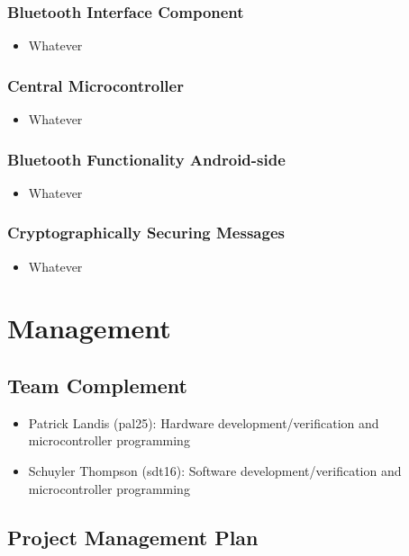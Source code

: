 \documentclass[12pt,letterpaper]{article}
\begin{document}
\subsubsection{Bluetooth Interface Component}
\begin{itemize}
\item Whatever
\end{itemize}

\subsubsection{Central Microcontroller}
\begin{itemize}
\item Whatever
\end{itemize}

\subsubsection{Bluetooth Functionality Android-side}
\begin{itemize}
\item Whatever
\end{itemize}

\subsubsection{Cryptographically Securing Messages}
\begin{itemize}
\item Whatever
\end{itemize}

\section{Management}
\subsection{Team Complement}
\begin{itemize}
	\item Patrick Landis (pal25): Hardware development/verification and microcontroller programming

	\item Schuyler Thompson (sdt16): Software development/verification and microcontroller programming
\end{itemize}

\subsection{Project Management Plan}

\end{document}
